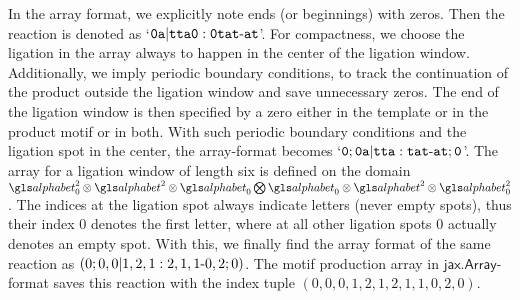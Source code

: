 In the array format, we explicitly note ends (or beginnings) with zeros.
Then the reaction is denoted as `$\mathtt{0a|tta0:0tat\text-at}$'.
For compactness, we choose the ligation in the array always to happen in the
center of the ligation window.
Additionally, we imply periodic boundary conditions, 
to track the continuation of the product outside the ligation window and save
unnecessary zeros. 
The end of the ligation window is then specified by a zero either in the
template or in the product motif or in both.
With such periodic boundary conditions and the ligation spot in the center, the
array-format becomes
`$\mathtt{0;0a|tta:tat\text-at;0}$'.
The array for a ligation window of length six is defined on the domain
$\alphabet_0^2 \otimes \alphabet^2 \otimes \alphabet_0 \bigotimes \alphabet_0
\otimes \alphabet^2 \otimes \alphabet_0^2$.
The indices at the ligation spot always indicate letters (never empty spots),
thus their index 0 denotes the first letter, where at all other ligation spots
0 actually denotes an empty spot.
With this, we finally find the array format of the same reaction as
$(0;0,0|1,2,1:2,1,1\text-0,2;0)$.
The motif production array in $\mathsf{jax.Array}$-format saves this reaction
with the index tuple $(0,0,0,1,2,1,2,1,1,0,2,0)$.
